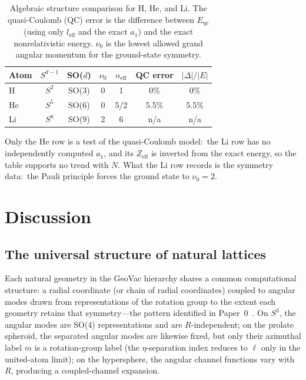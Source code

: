 \documentclass[aps,pra,twocolumn,superscriptaddress,longbibliography]{revtex4-2}
\begin{document}
\begin{table}[h]
\caption{Algebraic structure comparison for H, He, and Li.  The
quasi-Coulomb (QC) error is the difference between $E_{\mathrm{qc}}$
(using only $l_{\mathrm{eff}}$ and the exact $a_1$) and the exact
nonrelativistic energy.  $\nu_0$ is the lowest allowed grand
angular momentum for the ground-state symmetry.}
\label{tab:pattern}
\begin{ruledtabular}
\begin{tabular}{lcccccc}
  Atom & $S^{d-1}$ & SO($d$) & $\nu_0$ & $n_{\mathrm{eff}}$
  & QC error & $|\Delta|/|E|$ \\
  \hline
  H  & $S^2$ & SO(3) & 0 & 1   & 0\%   & 0\% \\
  He & $S^5$ & SO(6) & 0 & 5/2 & 5.5\% & 5.5\% \\
  Li & $S^8$ & SO(9) & 2 & 6   & n/a & n/a \\
\end{tabular}
\end{ruledtabular}
\end{table}

Only the He row is a test of the quasi-Coulomb model:\ the Li row
has no independently computed $a_1$, and its $Z_{\mathrm{eff}}$ is
inverted from the exact energy, so the table supports no trend with
$N$.  What the Li row records is the symmetry data:\ the Pauli
principle forces the ground state to $\nu_0 = 2$.



\section{Discussion}
\label{sec:discussion}

\subsection{The universal structure of natural lattices}

Each natural geometry in the GeoVac hierarchy shares a common
computational structure: a radial coordinate (or chain of radial
coordinates) coupled to angular modes drawn from representations of
the rotation group to the extent each geometry retains that symmetry---the
pattern identified in Paper~0~\cite{loutey_paper0}.  On $S^3$, the angular
modes are SO(4) representations and are $R$-independent; on the prolate
spheroid, the separated angular modes are likewise fixed, but only their
azimuthal label $m$ is a rotation-group label (the $\eta$-separation
index reduces to $\ell$ only in the united-atom limit); on the
hypersphere, the
angular channel functions vary with $R$, producing a coupled-channel
expansion.
\end{document}
